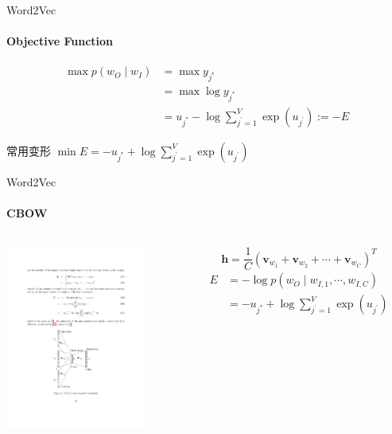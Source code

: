 \documentclass{beamer}
\begin{document}
\begin{frame}{Word2Vec}
    \framesubtitle{Objective Function}
    \begin{equation}
        \begin{aligned}
        \max p\left(w_{O} \mid w_{I}\right) &=\max y_{j^{*}} \\
        &=\max \log y_{j^{*}} \\
        &=u_{j^{*}}-\log \sum_{j^{\prime}=1}^{V} \exp \left(u_{j^{\prime}}\right):=-E
        \end{aligned}
    \end{equation}
    \begin{alertblock}{常用变形}
        $\min E=-u_{j^{*}}+\log \sum_{j^{\prime}=1}^{V} \exp \left(u_{j^{\prime}}\right)$
    \end{alertblock}
\end{frame}
\begin{frame}{Word2Vec}
    \framesubtitle{CBOW}
    \begin{columns}
        \begin{column}{0.4\textwidth}
            \centering\includegraphics[height=6cm]{word2vec_2.pdf}
        \end{column}
        \begin{column}{0.6\textwidth}
            $$\mathbf{h} = \frac{1}{C}(\mathbf{v}_{w_1} + \mathbf{v}_{w_2} + \cdots + \mathbf{v}_{w_C})^T$$
            $$
            \begin{aligned}
                E &=-\log p\left(w_{O} \mid w_{I, 1}, \cdots, w_{I, C}\right) \\
                &=-u_{j^{*}}+\log \sum_{j^{\prime}=1}^{V} \exp \left(u_{j^{\prime}}\right) \\
            \end{aligned}
            $$
        \end{column}
    \end{columns}
\end{frame}
\end{document}
